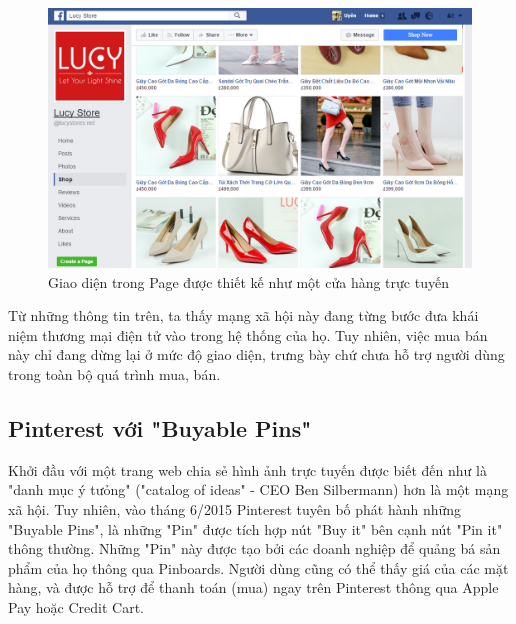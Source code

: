 \begin{figure}[H]
	\centering
	\includegraphics[scale=.4]{img/fb-in-store.PNG} 
	\caption{Giao diện trong Page được thiết kế như một cửa hàng trực tuyến}
\end{figure}

Từ những thông tin trên, ta thấy mạng xã hội này đang từng bước đưa khái niệm thương mại điện tử vào trong hệ thống của họ. Tuy nhiên, việc mua bán này chỉ đang dừng lại ở mức độ giao diện, trưng bày chứ chưa hỗ trợ người dùng trong toàn bộ quá trình mua, bán.

\subsection{Pinterest với "Buyable Pins"}
Khởi đầu với một trang web chia sẻ hình ảnh trực tuyến được biết đến như là "danh mục ý tưỏng" ("catalog of ideas" - CEO Ben Silbermann) hơn là một mạng xã hội. Tuy nhiên, vào tháng 6/2015 Pinterest tuyên bố phát hành những "Buyable Pins", là những "Pin" được tích hợp nút "Buy it" bên cạnh nút "Pin it" thông thường. Những "Pin" này được tạo bởi các doanh nghiệp để quảng bá sản phẩm của họ thông qua Pinboards. Người dùng cũng có thể thấy giá của các mặt hàng, và được hỗ trợ để thanh toán (mua) ngay trên Pinterest thông qua Apple Pay hoặc Credit Cart. 

